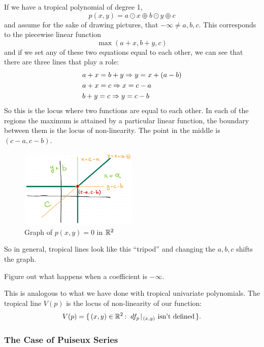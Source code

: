 \documentclass[12pt]{memoir}
\begin{document}
If we have a tropical polynomial of degree 1, 
$$p(x,y)=a\odot x\oplus b\odot y\oplus c$$
and assume for the sake of drawing pictures, that $-\infty\neq a,b,c$. This corresponds to the piecewise linear function 
$$\max(a+x,b+y,c)$$
and if we set any of these two equations equal to each other, we can see that there are three lines that play a role:
\begin{align*}
    &a+x=b+y\Rightarrow y=x+(a-b)\\
    &a+x=c\Rightarrow x=c-a\\
    &b+y=c\Rightarrow y=c-b
\end{align*}
So this is the locus where two functions are equal to each other. In each of the regions the maximum is attained by a particular linear function, the boundary between them is the locus of non-linearity. The point in the middle is $(c-a,c-b)$. 

\begin{figure}[h!]
    \centering
    \includegraphics[width=0.5\textwidth]{figs/fig7-1-TropicalLineExample.png}
    \caption{Graph of $p(x,y)=0$ in $\mathbb{R}^2$}
    \label{fig:7.1-TropicalLineExample}
\end{figure}

So in general, tropical lines look like this ``tripod'' and changing the $a,b,c$ shifts the graph. 

\begin{Ej}[2]
Figure out what happens when a coefficient is $-\infty$.
\end{Ej}

This is analogous to what we have done with tropical univariate polynomials. The tropical line $V(p)$ is the locus of non-linearity of our function:
$$V(p)=\set{(x,y)\in\bR^2\:\ df_p\!\mid\!_{(x,y)}\text{ isn't defined}}.$$
\subsubsection{The Case of Puiseux Series}
\end{document}

